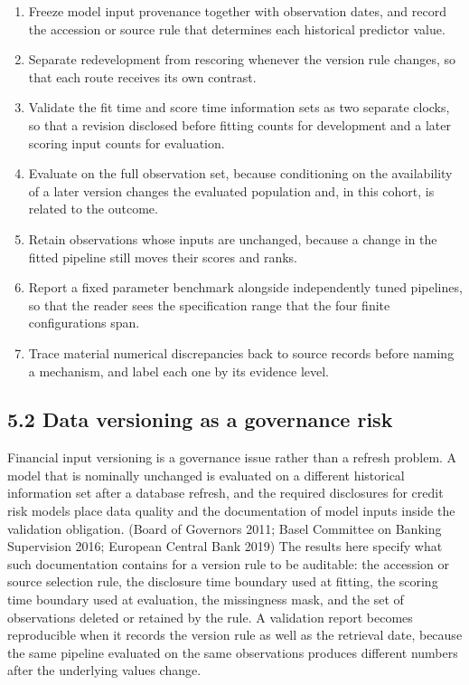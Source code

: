 \documentclass[10pt,a4paper,twocolumn]{article}
\begin{document}
\begin{enumerate}
\item Freeze model input provenance together with observation dates, and record the accession or source rule that determines each historical predictor value.
\item Separate redevelopment from rescoring whenever the version rule changes, so that each route receives its own contrast.
\item Validate the fit time and score time information sets as two separate clocks, so that a revision disclosed before fitting counts for development and a later scoring input counts for evaluation.
\item Evaluate on the full observation set, because conditioning on the availability of a later version changes the evaluated population and, in this cohort, is related to the outcome.
\item Retain observations whose inputs are unchanged, because a change in the fitted pipeline still moves their scores and ranks.
\item Report a fixed parameter benchmark alongside independently tuned pipelines, so that the reader sees the specification range that the four finite configurations span.
\item Trace material numerical discrepancies back to source records before naming a mechanism, and label each one by its evidence level.
\end{enumerate}

\subsection{5.2 Data versioning as a governance risk}

Financial input versioning is a governance issue rather than a refresh problem. A model that is nominally unchanged is evaluated on a different historical information set after a database refresh, and the required disclosures for credit risk models place data quality and the documentation of model inputs inside the validation obligation. (Board of Governors 2011; Basel Committee on Banking Supervision 2016; European Central Bank 2019) The results here specify what such documentation contains for a version rule to be auditable: the accession or source selection rule, the disclosure time boundary used at fitting, the scoring time boundary used at evaluation, the missingness mask, and the set of observations deleted or retained by the rule. A validation report becomes reproducible when it records the version rule as well as the retrieval date, because the same pipeline evaluated on the same observations produces different numbers after the underlying values change.
\end{document}
